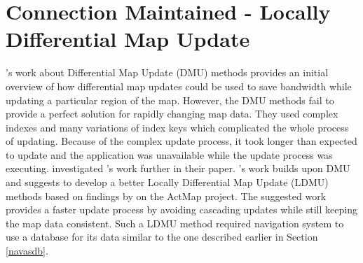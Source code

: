 \section{Connection Maintained - Locally Differential Map Update} \label{cmldmu}
\citet{sakamoto2000proposal}'s work about Differential Map Update (DMU) methods provides an initial overview of how differential map updates could be used to save bandwidth while updating a particular region of the map. However, the DMU methods fail to provide a perfect solution for rapidly changing map data. They used complex indexes and many variations of index keys which complicated the whole process of updating. Because of the complex update process, it took longer than expected to update and the application was unavailable while the update process was executing. \citet{asahara2008locally} investigated \citet{sakamoto2000proposal}'s work further in their paper. \citet{asahara2008locally}'s work builds upon DMU and suggests to develop a better Locally Differential Map Update (LDMU) methods based on findings by \citet{flament2005results} on the ActMap project\cite{flament2003actmap}. The suggested work provides a faster update process by avoiding cascading updates while still keeping the map data consistent. Such a LDMU method required navigation system to use a database for its data similar to the one described earlier in Section \ref{navasdb}. \\

